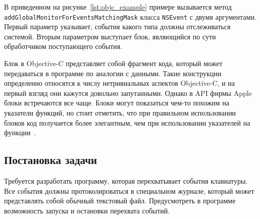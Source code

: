 В приведенном на рисунке~\ref{lst:objc_example} примере вызывается метод
\texttt{addGlobalMonitorForEventsMatchingMask} класса \texttt{NSEvent}
с двумя аргументами. Первый параметр указывает, события какого типа должны
отслеживаться системой. Вторым параметром выступает блок, являющийся по сути
обработчиком поступающего события.

Блок в Objective-C представляет собой фрагмент кода, который может
передаваться в программе по аналогии с данными. Такие конструкции определенно
относятся к числу нетривиальных аспектов Objective-C, и на первый взгляд они
кажутся довольно запутанными. Однако в API фирмы Apple блоки встречаются все
чаще. Блоки могут показаться чем-то похожим на указатели функций,
но стоит отметить, что при правильном использовании блоков код получается
более элегантным, чем при использовании указателей на функции~\cite{hillegass}.

\subsection{Постановка задачи}

Требуется разработать программу, которая перехватывает события клавиатуры.
Все события должны протоколироваться в специальном журнале, который может
представлять собой обычный текстовый файл. Предусмотреть в программе возможность
запуска и остановки перехвата событий.

\pagebreak
